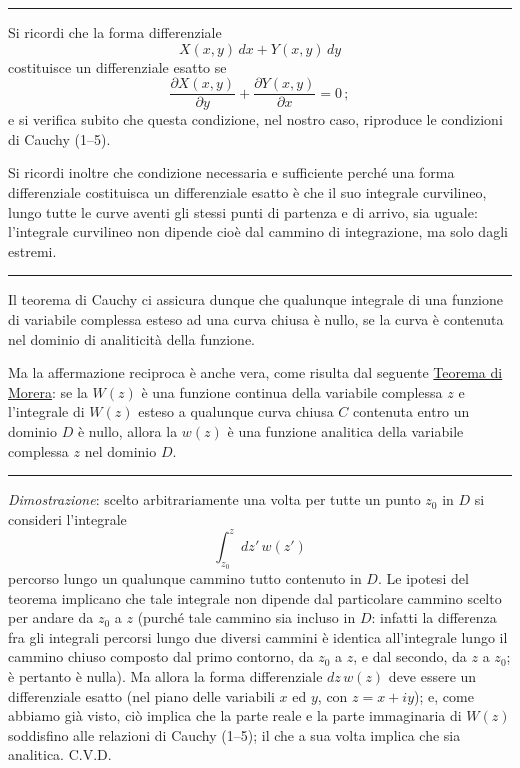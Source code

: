 \documentclass[11pt, a4paper]{book}
\numberwithin{equation}{section}
\begin{document}
\medskip\hrule\medskip

Si ricordi che la forma differenziale
\[
X(x,y)\, dx + Y(x,y)\, dy
\]
costituisce un differenziale esatto se
\[
\frac{\partial X(x,y)}{\partial y} + \frac{\partial Y(x,y)}{\partial x} = 0\,;
\]
e si verifica subito che questa condizione, nel nostro caso, riproduce le condizioni di Cauchy (1--5).

Si ricordi inoltre che condizione necessaria e sufficiente perché una forma differenziale costituisca un differenziale esatto è che il suo integrale curvilineo, lungo tutte le curve aventi gli stessi punti di partenza e di arrivo, sia uguale: l'integrale curvilineo non dipende cioè dal cammino di integrazione, ma solo dagli estremi.

\medskip\hrule\medskip

Il teorema di Cauchy ci assicura dunque che qualunque integrale di una funzione di variabile complessa esteso ad una curva chiusa è nullo, se la curva è contenuta nel dominio di analiticità della funzione.

Ma la affermazione reciproca è anche vera, come risulta dal seguente \uline{Teorema di Morera}: se la $W(z)$ è una funzione continua della variabile complessa $z$ e l'integrale di $W(z)$ esteso a qualunque curva chiusa $C$ contenuta entro un dominio $D$ è nullo, allora la $w(z)$ è una funzione analitica della variabile complessa $z$ nel dominio $D$.

\medskip\hrule\medskip

\textit{Dimostrazione}: scelto arbitrariamente una volta per tutte un punto $z_0$ in $D$ si consideri l'integrale
\[
\int_{z_0}^{z} dz'\, w(z')
\]
percorso lungo un qualunque cammino tutto contenuto in $D$. Le ipotesi del teorema implicano che tale integrale non dipende dal particolare cammino scelto per andare da $z_0$ a $z$ (purché tale cammino sia incluso in $D$: infatti la differenza fra gli integrali percorsi lungo due diversi cammini è identica all'integrale lungo il cammino chiuso composto dal primo contorno, da $z_0$ a $z$, e dal secondo, da $z$ a $z_0$; è pertanto è nulla). Ma allora la forma differenziale $dz\, w(z)$ deve essere un differenziale esatto (nel piano delle variabili $x$ ed $y$, con $z = x + iy$); e, come abbiamo già visto, ciò implica che la parte reale e la parte immaginaria di $W(z)$ soddisfino alle relazioni di Cauchy (1--5); il che a sua volta implica che sia analitica. C.V.D.

\medskip
\end{document}
